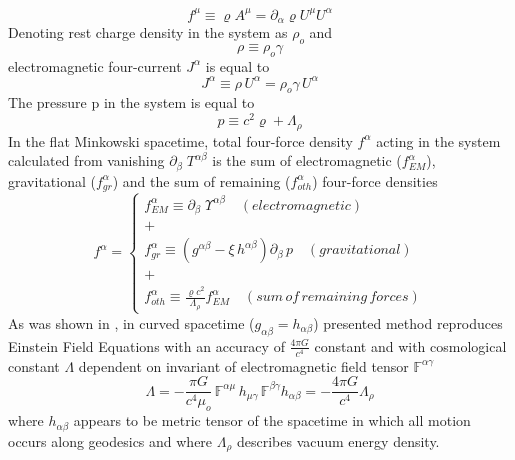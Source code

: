 \documentclass[aps,prx,preprint,groupedaddress,showkeys]{revtex4-2}
\begin{document}
\begin{equation} \label{TotFoI}
f^{\mu} \equiv \varrho A^{\mu} = \partial_{\alpha} \varrho U^{\mu} U^{\alpha}
\end{equation}
Denoting rest charge density in the system as $ \rho_o$ and
\begin{equation} \label{RHZERO}
\rho \equiv \rho_o \gamma
\end{equation}
electromagnetic four-current $J^{\alpha}$ is equal to
\begin{equation} \label{EN11}
J^{\alpha} \equiv \rho \, U^{\alpha} = \rho_o \gamma \, U^{\alpha}
\end{equation}
The pressure p in the system is equal to
\begin{equation} \label{Pressure}
p \equiv c^2 \varrho +  \Lambda_{\rho}
\end{equation}
In the flat Minkowski spacetime, total four-force density $f^{\alpha}$ acting in the system calculated from vanishing $\partial_{\beta} \; T^{\alpha \beta}$ is the sum of electromagnetic ($f^{\alpha}_{EM}$), gravitational ($f^{\alpha}_{gr}$) and the sum of remaining ($f^{\alpha}_{oth}$) four-force densities
\begin{equation} \label{forceDen}
f^{\alpha} = 
\begin{cases} 
f^{\alpha}_{EM} \equiv \partial_{\beta} \; \Upsilon^{\alpha \beta} \quad (electromagnetic) \\
+ \\
f^{\alpha}_{gr} \equiv \left ( g^{\alpha \beta} - \xi \, h^{\alpha \beta}  \right ) \partial_{\beta} \, p \quad (gravitational) \\
+ \\
f^{\alpha}_{oth} \equiv \frac{\varrho c^2}{\Lambda_{\rho}} f^{\alpha}_{EM}  \quad (sum \, of\, remaining \, forces)
\end{cases}
\end{equation}
As was shown in \cite{PMofC}, in curved spacetime ($g_{\alpha \beta} =h_{\alpha \beta}$) presented method reproduces Einstein Field Equations with an accuracy of $\frac{4\pi G}{c^4}$ constant and with cosmological constant $\Lambda$ dependent on invariant of electromagnetic field tensor $\mathbb{F}^{\alpha \gamma}$
\begin{equation} \label{CosmoCon}
\Lambda =  - \frac{\pi G}{c^4 \mu_o} \, \mathbb{F}^{\alpha \mu} \, h_{\mu \gamma} \, \mathbb{F}^{ \beta \gamma } h_{\alpha \beta} = - \frac{4\pi G}{c^4} \Lambda_{\rho}
\end{equation}
where $h_{\alpha \beta}$ appears to be metric tensor of the spacetime in which all motion occurs along geodesics and where $\Lambda_{\rho}$ describes vacuum energy density. \\
\end{document}
